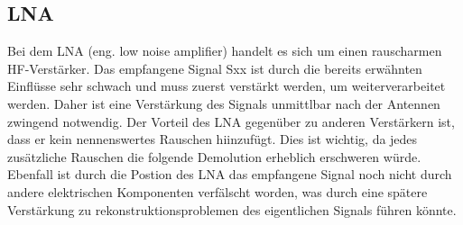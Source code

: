 \subsection{LNA}
Bei dem LNA (eng. low noise amplifier) handelt es sich um einen rauscharmen HF-Verstärker. Das empfangene Signal Sxx ist
durch die bereits erwähnten Einflüsse sehr schwach und muss  zuerst verstärkt werden, um weiterverarbeitet werden. Daher
ist eine Verstärkung des Signals unmittlbar nach der Antennen zwingend notwendig. Der Vorteil des LNA gegenüber zu
anderen Verstärkern ist, dass er kein nennenswertes Rauschen hiinzufügt. Dies ist wichtig, da jedes zusätzliche Rauschen
die folgende Demolution erheblich erschweren würde. Ebenfall ist durch die Postion des LNA das empfangene Signal noch 
nicht durch andere elektrischen Komponenten verfälscht worden, was durch eine spätere Verstärkung zu rekonstruktionsproblemen
des eigentlichen Signals führen könnte.
